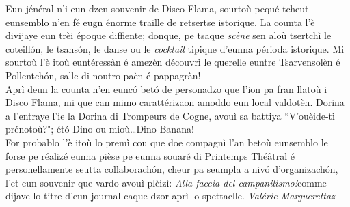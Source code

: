 \newline
\newline
\og Eun jénéral n'i eun dzen souvenir de Disco Flama, sourtoù pequé tcheut eunsemblo n'en fé eugn énorme traille de retsertse i\-storique. La counta l'è divijaye eun trèi époque diffiente; donque, pe tsaque \textit{scène} sen aloù tsertchì le coteill\'on, le tsans\'on, le danse ou le \textit{cocktail} tipique d'eunna périoda  istorique. Mi sourtoù l'è itoù euntéressàn é amezèn découvrì le querelle euntre Tsarvensolèn é Pollentch\'on, salle di noutro paèn é pappagràn!
\\ Aprì deun la counta n'en eunc\'o bet\'o de personadzo que l'ion pa fran llatoù i Disco Flama, mi que can mimo carattérizaon amoddo eun local valdotèn. Dorina a l'entraye l'ie la Dorina di Trompeurs de Cogne, avouì sa battiya ``V'ouèide-tì prénotoù?"; ét\'o Dino ou mioù\ldots Dino Banana!
\\ For probablo l'è itoù lo premì cou que doe compagnì l'an betoù eunsemblo le forse pe réalizé eunna pièse pe eunna souaré di Printemps Thé\^atral é personellamente seutta collaborach\'on, cheur pa seumpla a niv\'o d'organizach\'on, l'et eun souvenir que vardo avouì plèizì: \og\textit{Alla faccia del campanilismo!}\fg comme dijave lo titre d'eun journal caque dzor aprì lo spettaclle.\fg{}
\newline
\newline
\hspace*{\fill} \textit{Valérie Marguerettaz}
